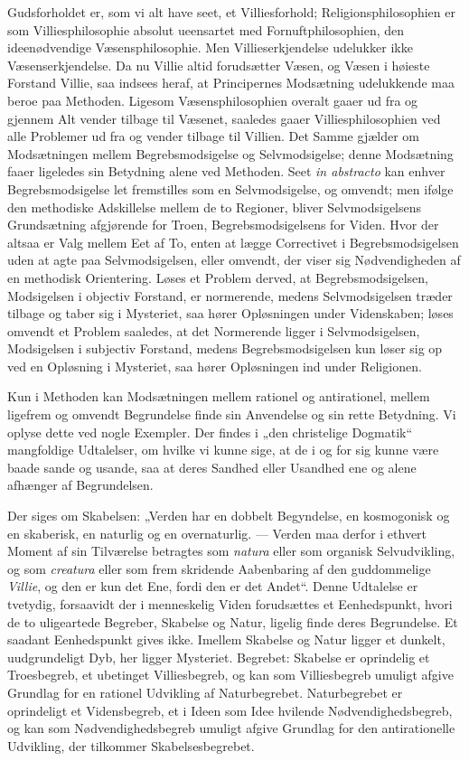 \documentclass[12pt]{book}
\begin{document}
Gudsforholdet er, som vi alt have seet, et Villiesforhold;
Religionsphilosophien er som Villiesphilosophie absolut ueensartet
med Fornuftphilosophien, den ideenødvendige Væsensphilosophie. Men
Villieserkjendelse udelukker ikke Væsenserkjendelse. Da nu Villie
altid forudsætter Væsen, og Væsen i høieste Forstand Villie, saa
indsees heraf, at Principernes Modsætning udelukkende maa beroe paa
Methoden. Ligesom Væsensphilosophien overalt
gaaer ud fra og gjennem Alt vender tilbage til Væsenet, saaledes
gaaer Villiesphilosophien ved alle Problemer ud fra og vender
tilbage til Villien. Det Samme gjælder om Modsætningen mellem
Begrebsmodsigelse og Selvmodsigelse; denne Modsætning faaer
ligeledes sin Betydning alene ved Methoden. Seet \textit{in
abstracto} kan enhver Begrebsmodsigelse let fremstilles som en
Selvmodsigelse, og omvendt; men ifølge den methodiske Adskillelse
mellem de to Regioner, bliver Selvmodsigelsens Grundsætning
afgjørende for Troen, Begrebsmodsigelsens for Viden. Hvor der altsaa
er Valg mellem Eet af To, enten at lægge Correctivet i
Begrebsmodsigelsen uden at agte paa Selvmodsigelsen, eller omvendt,
der viser sig Nødvendigheden af en methodisk Orientering. Løses et
Problem derved, at Begrebsmodsigelsen, Modsigelsen i objectiv
Forstand, er normerende, medens Selvmodsigelsen træder tilbage og
taber sig i Mysteriet, saa hører Opløsningen under Videnskaben;
løses omvendt et Problem saaledes, at det Normerende ligger i
Selvmodsigelsen, Modsigelsen i subjectiv Forstand, medens
Begrebsmodsigelsen kun løser sig op ved en Opløsning i Mysteriet,
saa hører Opløsningen ind under Religionen.

Kun i Methoden kan Modsætningen mellem rationel og antirationel,
mellem ligefrem og omvendt Begrundelse finde sin Anvendelse og sin
rette Betydning. Vi oplyse dette ved nogle Exempler. Der findes i
„den christelige Dogmatik“ mangfoldige Udtalelser, om hvilke vi
kunne sige, at de i og for sig kunne være baade sande og usande, saa
at deres Sandhed eller Usandhed ene og alene afhænger af
Begrundelsen.

Der siges om Skabelsen: „Verden har en dobbelt Begyndelse, en
kosmogonisk og en skaberisk, en naturlig og en overnaturlig. ---
Verden maa derfor i ethvert Moment af sin Tilværelse betragtes som
\textit{natura} eller som organisk Selvudvikling, og som
\textit{creatura} eller som frem\-
skridende Aabenbaring af den guddommelige \emph{Villie}, og den er
kun det Ene, fordi den er det Andet“. Denne Udtalelse er tvetydig,
forsaavidt der i menneskelig Viden forudsættes et Eenhedspunkt,
hvori de to uligeartede Begreber, Skabelse og Natur, ligelig finde
deres Begrundelse. Et saadant Eenhedspunkt gives ikke. Imellem
Skabelse og Natur ligger et dunkelt, uudgrundeligt Dyb, her ligger
Mysteriet. Begrebet: Skabelse er oprindelig et Troesbegreb, et
ubetinget Villiesbegreb, og kan som Villiesbegreb umuligt afgive
Grundlag for en rationel Udvikling af Naturbegrebet. Naturbegrebet
er oprindeligt et Vidensbegreb, et i Ideen som Idee hvilende
Nødvendighedsbegreb, og kan som Nødvendighedsbegreb umuligt afgive
Grundlag for den antirationelle Udvikling, der tilkommer
Skabelsesbegrebet.
\end{document}
